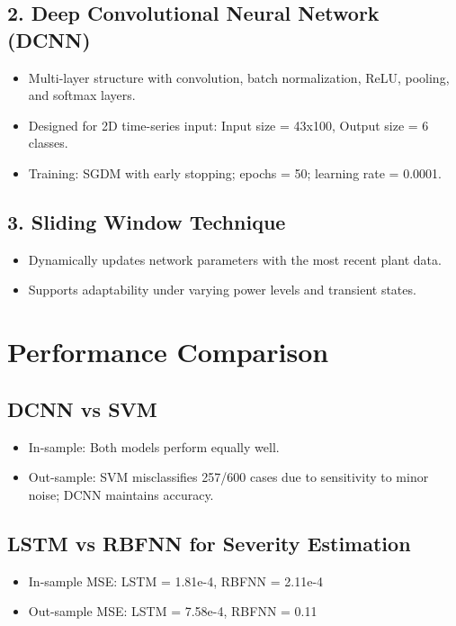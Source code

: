 \documentclass[12pt]{article}
\begin{document}
\subsection*{2. Deep Convolutional Neural Network (DCNN)}
\begin{itemize}
    \item Multi-layer structure with convolution, batch normalization, ReLU, pooling, and softmax layers.
    \item Designed for 2D time-series input: Input size = 43x100, Output size = 6 classes.
    \item Training: SGDM with early stopping; epochs = 50; learning rate = 0.0001.
\end{itemize}

\subsection*{3. Sliding Window Technique}
\begin{itemize}
    \item Dynamically updates network parameters with the most recent plant data.
    \item Supports adaptability under varying power levels and transient states.
\end{itemize}

\section*{Performance Comparison}

\subsection*{DCNN vs SVM}
\begin{itemize}
    \item In-sample: Both models perform equally well.
    \item Out-sample: SVM misclassifies 257/600 cases due to sensitivity to minor noise; DCNN maintains accuracy.
\end{itemize}

\subsection*{LSTM vs RBFNN for Severity Estimation}
\begin{itemize}
    \item In-sample MSE: LSTM = 1.81e-4, RBFNN = 2.11e-4
    \item Out-sample MSE: LSTM = 7.58e-4, RBFNN = 0.11
\end{itemize}
\end{document}
